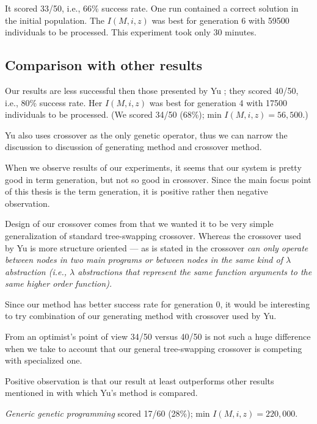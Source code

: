 \documentclass[12pt,a4paper]{report}
\begin{document}
It scored 33/50, i.e., 66\% success rate. One run
contained a correct solution in the initial population.
The $I(M,i,z)$ was best for generation 6 with 59500 
individuals to be processed.
This experiment took only 30 minutes. \\

\subsection{Comparison with other results}

Our results are less successful then those 
presented by Yu \cite{yu01};
they scored 40/50, i.e., 80\% success rate.  
Her $I(M,i,z)$ was best for generation 4 with 17500 
individuals to be processed.
(We scored 34/50 (68\%); min $I(M,i,z) = 56,500$.)

Yu also uses crossover as the only genetic operator, thus we
can narrow the discussion to discussion of generating method and 
crossover method. 

When we observe results of our experiments, it seems
that our system is pretty good in term generation, but not so good 
in crossover. Since the main focus point of this thesis is
the term generation, it is positive rather then negative observation.

Design of our crossover comes from that we wanted it to be
very simple generalization of standard tree-swapping crossover.
Whereas the crossover used by Yu is more structure oriented
--- as is stated in \cite{yu01} the crossover \textit{can only operate 
between nodes in two main programs or between nodes in the same
kind of $\lambda$ abstraction (i.e., $\lambda$ abstractions that 
represent the same function arguments to the same higher order function).}

Since our method has better success rate for generation 0, it would 
be interesting to try combination of our generating 
method with crossover used by Yu.

From an optimist's point of view 34/50 versus 40/50 
is not such a huge difference when we take to account that
our general tree-swapping crossover is competing with specialized one.   

Positive observation is that our result at least outperforms 
other results mentioned in \cite{yu01} with which Yu's method is compared.


\textit{Generic genetic programming} scored 17/60 (28\%); 
min $I(M,i,z) = 220,000$.
\end{document}
